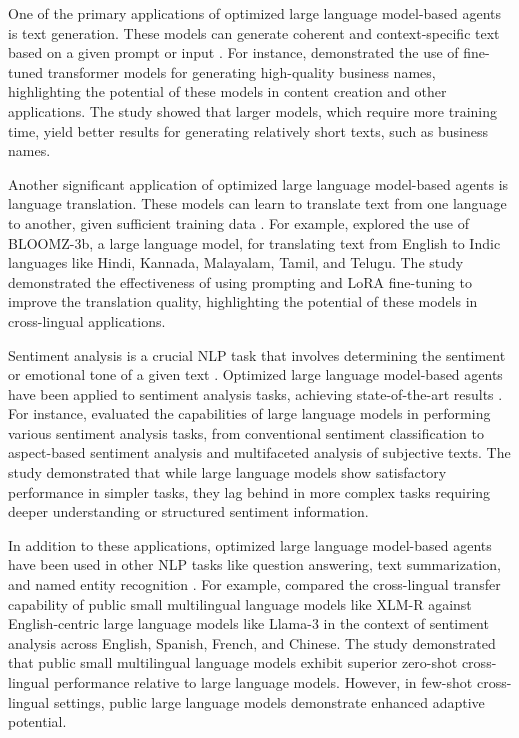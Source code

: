 \documentclass[11pt]{article}
\begin{document}
One of the primary applications of optimized large language model-based agents is text generation. These models can generate coherent and context-specific text based on a given prompt or input \cite{ref223}. For instance, \cite{ref223} demonstrated the use of fine-tuned transformer models for generating high-quality business names, highlighting the potential of these models in content creation and other applications. The study showed that larger models, which require more training time, yield better results for generating relatively short texts, such as business names.

Another significant application of optimized large language model-based agents is language translation. These models can learn to translate text from one language to another, given sufficient training data \cite{ref224}. For example, \cite{ref224} explored the use of BLOOMZ-3b, a large language model, for translating text from English to Indic languages like Hindi, Kannada, Malayalam, Tamil, and Telugu. The study demonstrated the effectiveness of using prompting and LoRA fine-tuning to improve the translation quality, highlighting the potential of these models in cross-lingual applications.

Sentiment analysis is a crucial NLP task that involves determining the sentiment or emotional tone of a given text \cite{ref222}. Optimized large language model-based agents have been applied to sentiment analysis tasks, achieving state-of-the-art results \cite{ref225}. For instance, \cite{ref225} evaluated the capabilities of large language models in performing various sentiment analysis tasks, from conventional sentiment classification to aspect-based sentiment analysis and multifaceted analysis of subjective texts. The study demonstrated that while large language models show satisfactory performance in simpler tasks, they lag behind in more complex tasks requiring deeper understanding or structured sentiment information.

In addition to these applications, optimized large language model-based agents have been used in other NLP tasks like question answering, text summarization, and named entity recognition \cite{ref226}. For example, \cite{ref226} compared the cross-lingual transfer capability of public small multilingual language models like XLM-R against English-centric large language models like Llama-3 in the context of sentiment analysis across English, Spanish, French, and Chinese. The study demonstrated that public small multilingual language models exhibit superior zero-shot cross-lingual performance relative to large language models. However, in few-shot cross-lingual settings, public large language models demonstrate enhanced adaptive potential.
\end{document}
